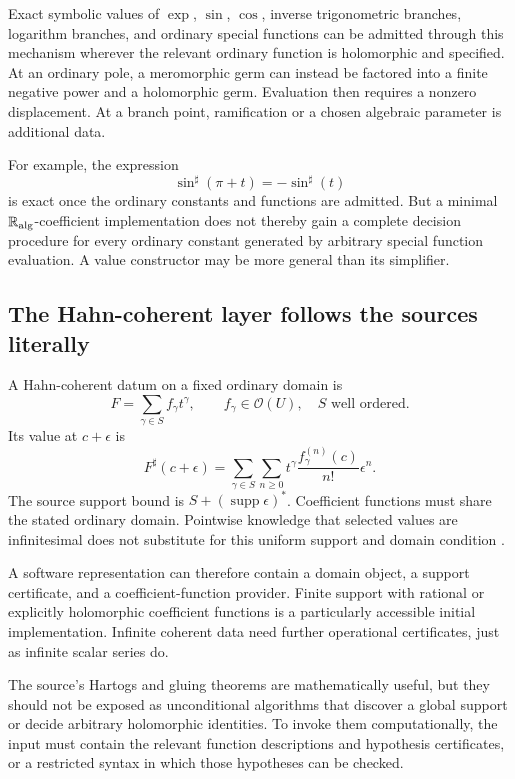 \documentclass[11pt,letterpaper]{article}
\numberwithin{equation}{section}
\theoremstyle{definition}
\theoremstyle{remark}\newtheorem{remark}[theorem]{Remark}
\newcommand{\RA}{\mathbb R_{\rm alg}}
\newcommand{\OO}{\mathcal O}
\newcommand{\supp}{\operatorname{supp}}
\newcommand{\sh}{^{\sharp}}
\begin{document}
Exact symbolic values of $\exp$, $\sin$, $\cos$, inverse trigonometric
branches, logarithm branches, and ordinary special functions can be admitted
through this mechanism wherever the relevant ordinary function is
holomorphic and specified. At an ordinary pole, a meromorphic germ can
instead be factored into a finite negative power and a holomorphic germ.
Evaluation then requires a nonzero displacement. At a branch point,
ramification or a chosen algebraic parameter is additional data.

For example, the expression
\[
 \sin\sh(\pi+t)=-\sin\sh(t)
\]
is exact once the ordinary constants and functions are admitted. But a
minimal $\RA$-coefficient implementation does not thereby gain a complete
decision procedure for every ordinary constant generated by arbitrary special
function evaluation. A value constructor may be more general than its
simplifier.

\subsection{The Hahn-coherent layer follows the sources literally}
A Hahn-coherent datum on a fixed ordinary domain is
\[
 F=\sum_{\gamma\in S}f_\gamma t^\gamma,
 \qquad f_\gamma\in\OO(U),\quad S\text{ well ordered}.
\]
Its value at $c+\epsilon$ is
\begin{equation}\label{eq:coherenteval}
 F\sh(c+\epsilon)=
 \sum_{\gamma\in S}\sum_{n\ge0}
 t^\gamma\frac{f_\gamma^{(n)}(c)}{n!}\epsilon^n.
\end{equation}
The source support bound is $S+(\supp\epsilon)^*$. Coefficient functions
must share the stated ordinary domain. Pointwise knowledge that selected
values are infinitesimal does not substitute for this uniform support and
domain condition \cite{SourceAnalysis,SourceResearch}.

A software representation can therefore contain a domain object, a support
certificate, and a coefficient-function provider. Finite support with rational
or explicitly holomorphic coefficient functions is a particularly accessible
initial implementation. Infinite coherent data need further operational
certificates, just as infinite scalar series do.

The source's Hartogs and gluing theorems are mathematically useful, but they
should not be exposed as unconditional algorithms that discover a global
support or decide arbitrary holomorphic identities. To invoke them
computationally, the input must contain the relevant function descriptions
and hypothesis certificates, or a restricted syntax in which those
hypotheses can be checked.
\end{document}
